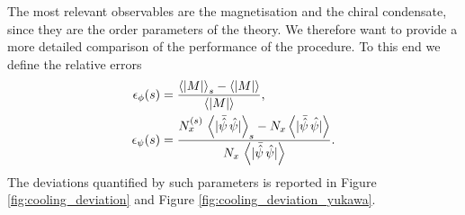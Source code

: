 \newpage
The most relevant observables are the magnetisation and the chiral condensate, since they are the order parameters of the theory. We therefore want to provide a more detailed comparison of the performance of the procedure. To this end we define the relative errors
\begin{equation}
    \begin{aligned}
        \epsilon_\phi(s) &= \frac{\left\langle |M| \right\rangle_{s} - \left\langle |M| \right\rangle}{\left\langle |M| \right\rangle}, \\
        \epsilon_\psi(s) &= \frac{N_x^{(s)} \,\left\langle |\bar{\hat\psi} \, \hat{\psi}| \right\rangle_{s} - N_x\left\langle |\bar{\hat\psi} \, \hat{\psi|} \right\rangle}{N_x \, \left\langle |\bar{\hat\psi} \, \hat{\psi}| \right\rangle}.
    \end{aligned}
    \label{eq:cooling_relative_deviation}
\end{equation}
The deviations quantified by such parameters is reported in Figure \ref{fig:cooling_deviation} and  Figure \ref{fig:cooling_deviation_yukawa}.
